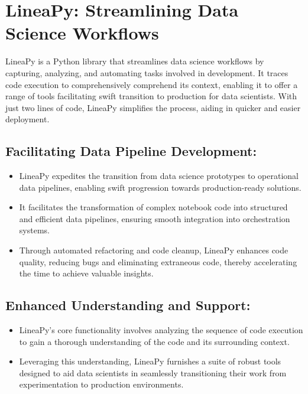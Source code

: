 	\section{LineaPy: Streamlining Data Science Workflows}
	
	LineaPy is a Python library that streamlines data science workflows by capturing, analyzing, and automating tasks involved in development. It traces code execution to comprehensively comprehend its context, enabling it to offer a range of tools facilitating swift transition to production for data scientists. With just two lines of code, LineaPy simplifies the process, aiding in quicker and easier deployment.
	
	\subsection{Facilitating Data Pipeline Development:}
	\begin{itemize}
		\item LineaPy expedites the transition from data science prototypes to operational data pipelines, enabling swift progression towards production-ready solutions.
		\item It facilitates the transformation of complex notebook code into structured and efficient data pipelines, ensuring smooth integration into orchestration systems.
		\item Through automated refactoring and code cleanup, LineaPy enhances code quality, reducing bugs and eliminating extraneous code, thereby accelerating the time to achieve valuable insights.
	\end{itemize}
	
	\subsection{Enhanced Understanding and Support:}
	\begin{itemize}
		\item LineaPy's core functionality involves analyzing the sequence of code execution to gain a thorough understanding of the code and its surrounding context.
		\item Leveraging this understanding, LineaPy furnishes a suite of robust tools designed to aid data scientists in seamlessly transitioning their work from experimentation to production environments.
	\end{itemize}
	
